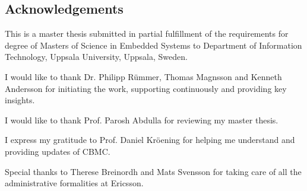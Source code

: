 \documentclass[titlepage]{book}
\begin{document}
\begin{comment}


Thesis work is done considering an Ericsson's multicore platform as case study, which uses DSP-C as programming language. \index{DSP-C}DSP-C is a set of language extensions on ISO C programming language. These extensions allow programmers to describe features of Digital Signal Processor (DSP). The work includes extending CBMC to support DSP-C, identifying Bounded Model Checking (BMC) techniques to cope-up with concurrency of Ericsson's multicore Digital Signal Processor (DSP) platform and implementing new features in CBMC to detect issues with Ericsson's parallel software. 


\end{comment}





\frontmatter

\newpage
\cleardoublepage
\begin{center}
\section{Acknowledgements}
\end{center}

This is a master thesis submitted in partial fulfillment of the requirements for degree of Masters of Science in Embedded Systems to Department of Information Technology, Uppsala University, Uppsala, Sweden.

I would like to thank Dr. Philipp R\"ummer, Thomas Magnsson and Kenneth Andersson for initiating the work, supporting continuously and providing key insights.

I would like to thank Prof. Parosh Abdulla for reviewing my master thesis.

I express my gratitude to Prof. Daniel Kr\"oening for helping me understand and providing updates of CBMC. 

Special thanks to Therese Breinordh and Mats Svensson for taking care of all the administrative formalities at Ericsson.
\end{document}

